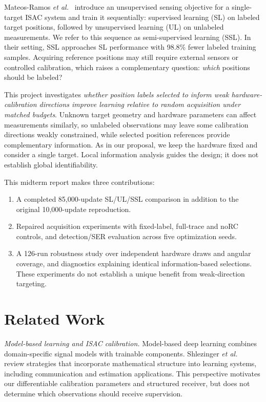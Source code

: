 \documentclass[conference]{IEEEtran}
\begin{document}
Mateos-Ramos \emph{et al.}~\cite{ssl} introduce an unsupervised sensing objective for a single-target ISAC system and train it sequentially: supervised learning (SL) on labeled target positions, followed by unsupervised learning (UL) on unlabeled measurements. We refer to this sequence as semi-supervised learning (SSL). In their setting, SSL approaches SL performance with 98.8\% fewer labeled training samples. Acquiring reference positions may still require external sensors or controlled calibration, which raises a complementary question: \emph{which} positions should be labeled?

This project investigates \emph{whether position labels selected to inform weak hardware-calibration directions improve learning relative to random acquisition under matched budgets}. Unknown target geometry and hardware parameters can affect measurements similarly, so unlabeled observations may leave some calibration directions weakly constrained, while selected position references provide complementary information. As in our proposal, we keep the hardware fixed and consider a single target. Local information analysis guides the design; it does not establish global identifiability.

This midterm report makes three contributions:
\begin{enumerate}
\item A completed 85,000-update SL/UL/SSL comparison in addition to the original 10,000-update reproduction.
\item Repaired acquisition experiments with fixed-label, full-trace and noRC controls, and detection/SER evaluation across five optimization seeds.
\item A 126-run robustness study over independent hardware draws and angular coverage, and diagnostics explaining identical information-based selections. These experiments do not establish a unique benefit from weak-direction targeting.


\end{enumerate}

\section{Related Work}
\emph{Model-based learning and ISAC calibration.} Model-based deep learning combines domain-specific signal models with trainable components. Shlezinger \emph{et al.}~\cite{mbdl} review strategies that incorporate mathematical structure into learning systems, including communication and estimation applications. This perspective motivates our differentiable calibration parameters and structured receiver, but does not determine which observations should receive supervision.
\end{document}
